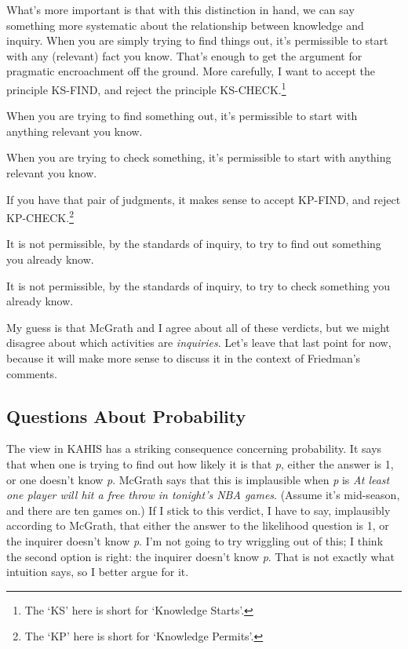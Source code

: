 \documentclass[
  11pt,
  letterpaper,
  DIV=11,
  numbers=noendperiod,
  twoside]{scrartcl}
\providecommand{\tightlist}{%
  \setlength{\itemsep}{0pt}\setlength{\parskip}{0pt}}
\begin{document}
What's more important is that with this distinction in hand, we can say
something more systematic about the relationship between knowledge and
inquiry. When you are simply trying to find things out, it's permissible
to start with any (relevant) fact you know. That's enough to get the
argument for pragmatic encroachment off the ground. More carefully, I
want to accept the principle KS-FIND, and reject the principle
KS-CHECK.\footnote{The `KS' here is short for `Knowledge Starts'.}

\begin{description}
\tightlist
\item[KS-FIND]
When you are trying to find something out, it's permissible to start
with anything relevant you know.
\item[KS-CHECK]
When you are trying to check something, it's permissible to start with
anything relevant you know.
\end{description}

If you have that pair of judgments, it makes sense to accept KP-FIND,
and reject KP-CHECK.\footnote{The `KP' here is short for `Knowledge
  Permits'.}

\begin{description}
\tightlist
\item[KP-FIND]
It is not permissible, by the standards of inquiry, to try to find out
something you already know.
\item[KP-CHECK]
It is not permissible, by the standards of inquiry, to try to check
something you already know.
\end{description}

My guess is that McGrath and I agree about all of these verdicts, but we
might disagree about which activities are \emph{inquiries}. Let's leave
that last point for now, because it will make more sense to discuss it
in the context of Friedman's comments.

\subsection{Questions About Probability}\label{sec-mcgrath-probability}

The view in KAHIS has a striking consequence concerning probability. It
says that when one is trying to find out how likely it is that \emph{p},
either the answer is 1, or one doesn't know \emph{p}. McGrath says that
this is implausible when \emph{p} is \emph{At least one player will hit
a free throw in tonight's NBA games}. (Assume it's mid-season, and there
are ten games on.) If I stick to this verdict, I have to say,
implausibly according to McGrath, that either the answer to the
likelihood question is 1, or the inquirer doesn't know \emph{p}. I'm not
going to try wriggling out of this; I think the second option is right:
the inquirer doesn't know \emph{p}. That is not exactly what intuition
says, so I better argue for it.
\end{document}
